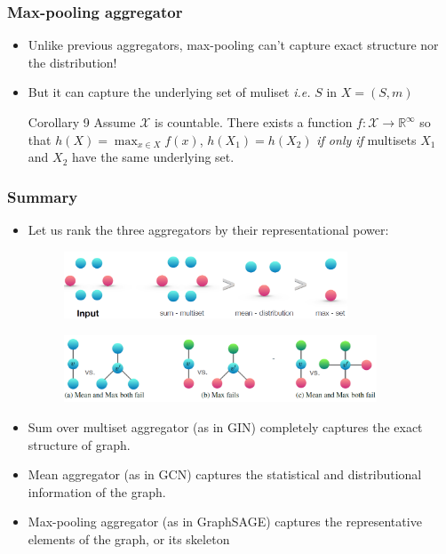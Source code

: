 \documentclass{beamer}
\begin{document}
\begin{frame}
\frametitle{Max-pooling aggregator}

\begin{itemize}
	\item Unlike previous aggregators, max-pooling can't capture exact structure nor the distribution! \pause
	
	\item But it can capture the \alert{underlying set of muliset} {\it i.e.} $S$ in $X = (S, m)$ \pause

\begin{block}{Corollary 9}
Assume $\mathcal{X}$ is countable.
There exists a function $f : \mathcal{X} \rightarrow \mathbb{R}^\infty$ so that $h(X) = \max_{x \in X} f(x)$, $h(X_1) = h(X_2)$ {\it if only if} multisets $X_1$ and $X_2$ have the same underlying set.

\end{block}

\end{itemize}
\end{frame}

\begin{frame}
\frametitle{Summary}

\begin{itemize}
	\item Let us rank the three aggregators by their representational power: \pause

\begin{figure}[hbt]
  \includegraphics[height=2cm]{fig3.png}
\end{figure} \pause

\begin{figure}[hbt]
  \includegraphics[height=2cm]{fig4.png}
\end{figure}

	\item Sum over multiset aggregator (as in GIN) completely captures the exact structure of graph. \pause
		
	\item Mean aggregator (as in GCN) captures the statistical and distributional information of the graph. \pause
	
	\item Max-pooling aggregator (as in GraphSAGE) captures the representative elements of the graph, or its skeleton
\end{itemize}


\end{frame}
\end{document}
